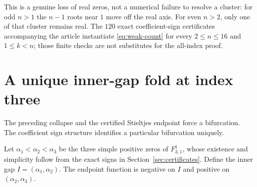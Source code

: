 \documentclass[11pt,letterpaper]{article}
\numberwithin{equation}{section}
\theoremstyle{definition}\newtheorem{definition}[theorem]{Definition}
\theoremstyle{remark}\newtheorem{remark}[theorem]{Remark}
\newcommand{\F}[3]{F_{#1,#2}^{#3}}
\begin{document}
This is a genuine loss of real zeros, not a numerical failure to resolve a cluster: for odd $n>1$ the $n-1$ roots near $1$ move off the real axis. For even $n>2$, only one of that cluster remains real. The $120$ exact coefficient-sign certificates accompanying the article instantiate \eqref{eq:weak-count} for every $2\le n\le16$ and $1\le k<n$; those finite checks are not substitutes for the all-index proof.

\section{A unique inner-gap fold at index three}\label{sec:fold}
The preceding collapse and the certified Stieltjes endpoint force a bifurcation. The coefficient sign structure identifies a particular bifurcation uniquely.

Let $\alpha_1<\alpha_2<\alpha_3$ be the three simple positive zeros of $\F31{1}$, whose existence and simplicity follow from the exact signs in Section~\ref{sec:certificates}. Define the inner gap $I=(\alpha_1,\alpha_2)$. The endpoint function is negative on $I$ and positive on $(\alpha_2,\alpha_3)$.
\end{document}
